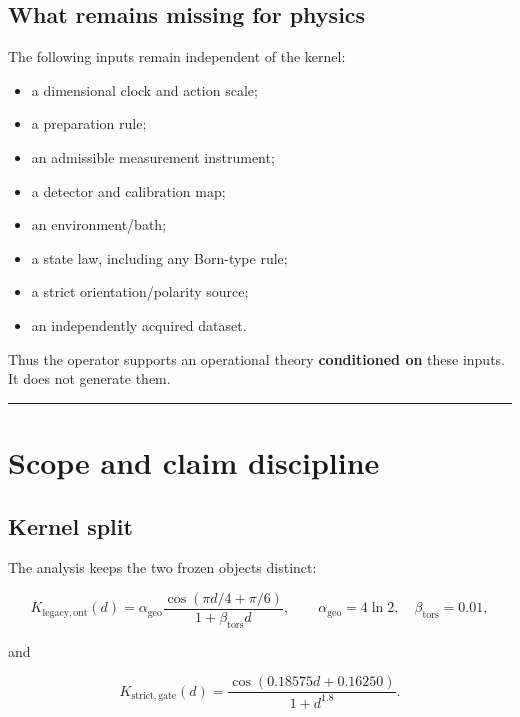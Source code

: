 \documentclass[11pt,a4paper,openany]{report}
\begin{document}
\section{What remains missing for physics}

The following inputs remain independent of the kernel:

\begin{itemize}
\item 
a dimensional clock and action scale;

\item 
a preparation rule;

\item 
an admissible measurement instrument;

\item 
a detector and calibration map;

\item 
an environment/\allowbreak{}bath;

\item 
a state law, including any Born-type rule;

\item 
a strict orientation/\allowbreak{}polarity source;

\item 
an independently acquired dataset.

\end{itemize}

Thus the operator supports an operational theory \textbf{conditioned on} these inputs. It does not generate them.

\par\medskip\hrule\medskip

\chapter{Scope and claim discipline}

\section{Kernel split}

The analysis keeps the two frozen objects distinct:

\[
K_{\mathrm{legacy,ont}}(d)
=
\alpha_{\mathrm{geo}}
\frac{\cos(\pi d/4+\pi/6)}
{1+\beta_{\mathrm{tors}}d},
\qquad
\alpha_{\mathrm{geo}}=4\ln2,
\quad
\beta_{\mathrm{tors}}=0.01,
\]

and

\[
K_{\mathrm{strict,gate}}(d)
=
\frac{\cos(0.18575d+0.16250)}
{1+d^{1.8}}.
\]
\end{document}
